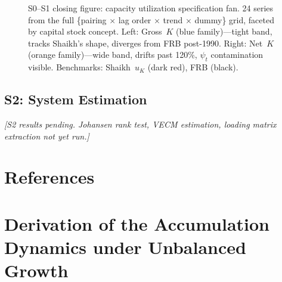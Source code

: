 \documentclass[11pt,a4paper]{article}
\begin{document}
\begin{figure}[!ht]
	\centering
	\caption{S0--S1 closing figure: capacity utilization specification fan. 24 series from the full \{pairing $\times$ lag order $\times$ trend $\times$ dummy\} grid, faceted by capital stock concept. Left: Gross~$K$ (blue family)---tight band, tracks Shaikh's shape, diverges from FRB post-1990. Right: Net~$K$ (orange family)---wide band, drifts past 120\%, $\psi_t$ contamination visible. Benchmarks: Shaikh~$u_K$ (dark red), FRB (black).}
	\label{fig:S0S1_fan}
\end{figure}



\subsection{S2: System Estimation}
\label{subsec:S2_results}

\textit{[S2 results pending. Johansen rank test, VECM estimation, loading matrix extraction not yet run.]}


\pagebreak



\section{References}


\label{references}

\pagebreak
\appendix



\appendix

\section{Derivation of the Accumulation Dynamics under Unbalanced Growth}
\label{app:bernoulli}
\end{document}
